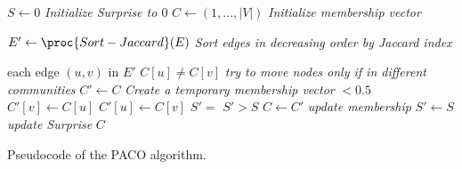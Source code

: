 \begin{Algorithm}[htb!]
\begin{codebox}
\li $S\gets 0$ \Comment \emph{Initialize Surprise to $0$}
\li $C \gets (1,\ldots,|V|)$  \Comment \emph{Initialize membership vector}

\li $E' \gets \proc{Sort-Jaccard}(E)$ \Comment \emph{Sort edges in decreasing order by Jaccard index}

\li \For each edge $(u,v)$ in $E'$
\li \Do \li \If $C[u] \neq C[v]$ \Comment \emph{try to move nodes only if in different communities}
\li \Then
\li $C' \gets C$ \Comment \emph{Create a temporary membership vector}
\li \If {} $< 0.5$ 
\li \Then 
\li $C'[v] \gets C[u]$
\li	\Else
\li $C'[u] \gets C[v]$ \End
\li $S' =$ 
\li \Do \If $S'>S$
\li \Then
\li $C \gets C'$ \Comment \emph{update membership}
\li $S' \gets S$ \Comment \emph{update Surprise}
\End
\End \End \End
\li \Return $C$
\end{codebox}
\caption{Pseudocode of the PACO algorithm.}
\label{algo:paco}
\end{Algorithm}